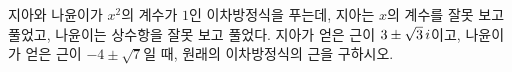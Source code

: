 지아와 나윤이가 $x^2$의 계수가 $1$인 이차방정식을 푸는데, 지아는 $x$의 계수를 잘못 보고 풀었고, 나윤이는 상수항을 잘못 보고 풀었다. 지아가 얻은 근이 $3\pm\sqrt{3}\mkern3mu i$이고, 나윤이가 얻은 근이 $-4\pm\sqrt{7}$일 때, 원래의 이차방정식의 근을 구하시오.

